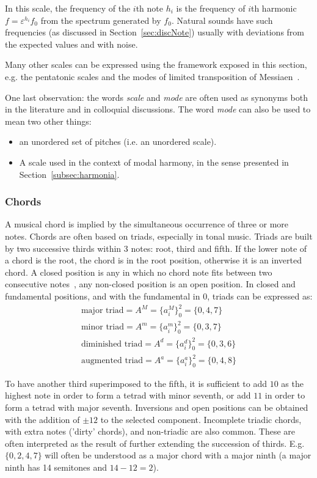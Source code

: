 In this scale, the frequency of the $i$th note $h_i$ is the frequency of $i$th harmonic $f=\varepsilon^{h_i} f_0$ from the spectrum generated by $f_0$. Natural sounds have such frequencies (as discussed in Section~\ref{sec:discNote}) usually with deviations from the expected values and with noise.

Many other scales can be expressed using the framework exposed in this section, e.g. the pentatonic scales and the modes of limited transposition of Messiaen~\cite{Messiaen}.

One last observation: the words \emph{scale} and \emph{mode} are often used as synonyms both in the literature and in colloquial discussions.
The word \emph{mode} can also be used to mean two other things:
\begin{itemize}
	\item an unordered set of pitches (i.e. an unordered scale).
	\item A scale used in the context of modal harmony, in the sense presented in Section~\ref{subsec:harmonia}.
\end{itemize}

\subsubsection{Chords}\label{subsec:acordes}
A musical chord is implied by the simultaneous occurrence of three or more notes. Chords are often based on triads, especially in tonal music. Triads are built by two successive thirds
within 3 notes: root, third and fifth. If the lower note of a chord is the root, the chord is in the root position, otherwise it is an inverted chord. A closed position is any in which no chord note fits between two consecutive
notes~\cite{Lacerda}, any non-closed position is an open position. In closed and fundamental positions,
and with the fundamental in $0$, triads can be expressed as:
\begin{equation}\label{triades}
\begin{split}
\text{major triad} = A^M= \{a_i^M\}_0^2=\{0,4,7\} \\ 
\text{minor triad} = A^m = \{a_i^m\}_0^2=\{0,3,7\} \\
\text{diminished triad} = A^d = \{a_i^d\}_0^2=\{0,3,6\} \\
\text{augmented triad} = A^a = \{a_i^a\}_0^2=\{0,4,8\}
\end{split}
\end{equation}

To have another third superimposed to the fifth, it is sufficient to add $10$ as the highest note in order to form a tetrad with minor seventh, or add $11$ in order to form a tetrad with major
seventh. Inversions and open positions can be obtained with the 
addition of $\pm 12$ to the selected component. Incomplete triadic chords, with extra notes ('dirty' chords), and non-triadic
are also common.
These are often interpreted as the result of further extending the succession of thirds.
E.g. $\{0,2,4,7\}$ will often be understood as a major chord with a major ninth (a major ninth has 14 semitones and $14-12 = 2$).


